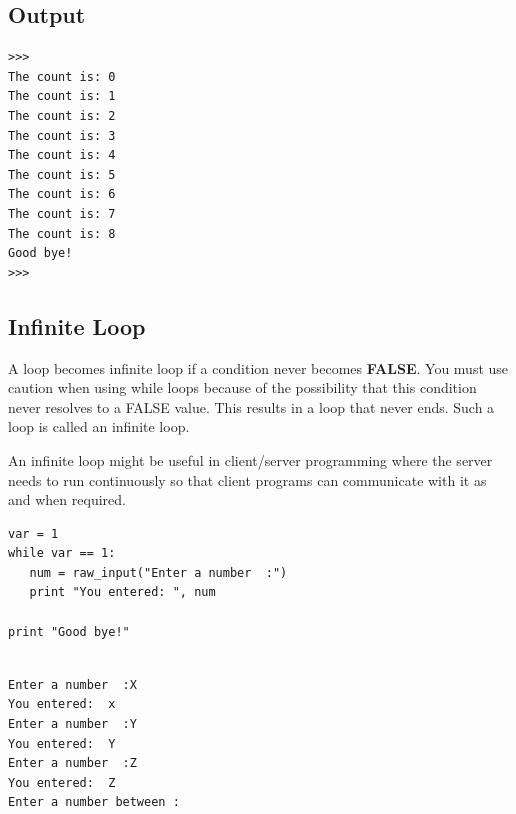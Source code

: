 \subsection{Output}
\begin{shaded}
\begin{verbatim}
>>> 
The count is: 0
The count is: 1
The count is: 2
The count is: 3
The count is: 4
The count is: 5
The count is: 6
The count is: 7
The count is: 8
Good bye!
>>> 
\end{verbatim}
\end{shaded}

\subsection{Infinite Loop}
A loop becomes {\color{red}infinite loop} if a condition never becomes {\textbf{FALSE}}. You must use caution when using while loops because of the possibility that this condition never resolves to a FALSE value. This results in a loop that never ends. Such a loop is called an infinite loop.

An infinite loop might be useful in client/server programming where the server needs to run continuously so that client programs can communicate with it as and when required.
\begin{framed}
\begin{verbatim}
var = 1
while var == 1:
   num = raw_input("Enter a number  :")
   print "You entered: ", num

print "Good bye!"
\end{verbatim}
\end{framed}

\begin{shaded}
\begin{verbatim}

Enter a number  :X
You entered:  x
Enter a number  :Y
You entered:  Y
Enter a number  :Z
You entered:  Z
Enter a number between :

\end{verbatim}
\end{shaded}

